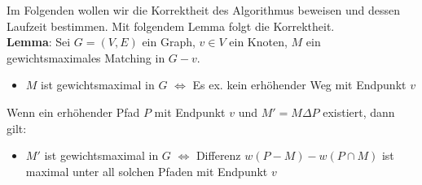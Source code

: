 Im Folgenden wollen wir die Korrektheit des Algorithmus beweisen und dessen Laufzeit bestimmen. Mit folgendem Lemma folgt die Korrektheit.\\

\textbf{Lemma}: Sei $G=(V,E)$ ein Graph, $v\in V$ ein Knoten, $M$ ein gewichtsmaximales Matching in $G-v$. 
\begin{itemize}
	\item $M$ ist gewichtsmaximal in $G$ $\iff$ Es ex. kein erhöhender Weg mit Endpunkt $v$
\end{itemize}
Wenn ein erhöhender Pfad $P$ mit Endpunkt $v$ und $M'=M\Delta P$ existiert, dann gilt:
\begin{itemize}
	\item $M'$ ist gewichtsmaximal in $G$ $\iff$ Differenz $w(P-M)-w(P\cap M)$ ist maximal unter all solchen Pfaden mit Endpunkt $v$
\end{itemize}


